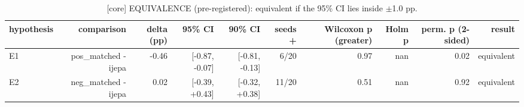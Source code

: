 \begin{table}[t]
\centering
\small
\caption{[core] EQUIVALENCE (pre-registered): equivalent if the 95\% CI lies inside $\pm$1.0 pp.}
\label{tab:equivalence_comparisons}
\begin{tabular}{lrrrrrrrrr}
\toprule
hypothesis & comparison & delta (pp) & 95\% CI & 90\% CI & seeds + & Wilcoxon p (greater) & Holm p & perm. p (2-sided) & result \\
\midrule
E1 & pos\_matched - ijepa & -0.46 & [-0.87, -0.07] & [-0.81, -0.13] & 6/20 & 0.97 & nan & 0.02 & equivalent \\
E2 & neg\_matched - ijepa & 0.02 & [-0.39, +0.43] & [-0.32, +0.38] & 11/20 & 0.51 & nan & 0.92 & equivalent \\
\bottomrule
\end{tabular}
\end{table}
